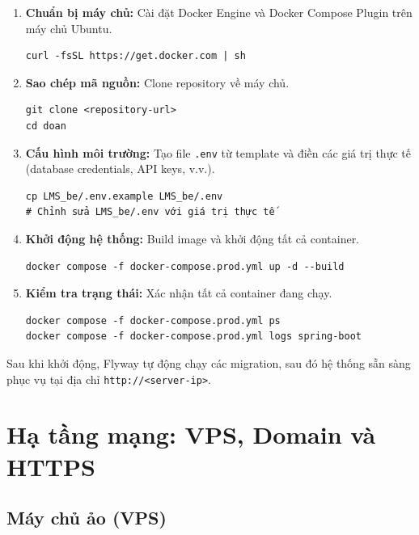 \begin{enumerate}
    \item \textbf{Chuẩn bị máy chủ:} Cài đặt Docker Engine và Docker Compose
          Plugin trên máy chủ Ubuntu.

    \begin{verbatim}
curl -fsSL https://get.docker.com | sh
    \end{verbatim}

    \item \textbf{Sao chép mã nguồn:} Clone repository về máy chủ.

    \begin{verbatim}
git clone <repository-url>
cd doan
    \end{verbatim}

    \item \textbf{Cấu hình môi trường:} Tạo file \texttt{.env} từ template và
          điền các giá trị thực tế (database credentials, API keys, v.v.).

    \begin{verbatim}
cp LMS_be/.env.example LMS_be/.env
# Chỉnh sửa LMS_be/.env với giá trị thực tế
    \end{verbatim}

    \item \textbf{Khởi động hệ thống:} Build image và khởi động tất cả container.

    \begin{verbatim}
docker compose -f docker-compose.prod.yml up -d --build
    \end{verbatim}

    \item \textbf{Kiểm tra trạng thái:} Xác nhận tất cả container đang chạy.

    \begin{verbatim}
docker compose -f docker-compose.prod.yml ps
docker compose -f docker-compose.prod.yml logs spring-boot
    \end{verbatim}
\end{enumerate}

Sau khi khởi động, Flyway tự động chạy các migration, sau đó hệ thống sẵn sàng
phục vụ tại địa chỉ \texttt{http://<server-ip>}.

\section{Hạ tầng mạng: VPS, Domain và HTTPS}

\subsection{Máy chủ ảo (VPS)}


